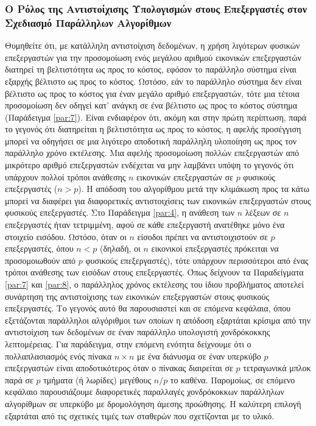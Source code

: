 \documentclass[12pt,a4paper]{article} %
\begin{document}
\subsubsection*{Ο Ρόλος της Αντιστοίχισης Υπολογισμών στους Επεξεργαστές στον \\ Σχεδιασμό Παράλληλων Αλγορίθμων}
Θυμηθείτε ότι, με κατάλληλη αντιστοίχιση δεδομένων, η χρήση λιγότερων 
φυσικών επεξεργαστών για την προσομοίωση ενός μεγάλου αριθμού εικονικών 
επεξεργαστών διατηρεί τη βελτιστότητα ως προς το κόστος, εφόσον το παράλληλο 
σύστημα είναι εξαρχής βέλτιστο ως προς το κόστος. Ωστόσο, εάν το παράλληλο 
σύστημα δεν είναι βέλτιστο ως προς το κόστος για έναν μεγάλο αριθμό 
επεξεργαστών, τότε μια τέτοια προσομοίωση δεν οδηγεί κατ’ ανάγκη σε ένα 
βέλτιστο ως προς το κόστος σύστημα (Παράδειγμα \ref{par:7}). Είναι 
ενδιαφέρον ότι, ακόμη και στην πρώτη περίπτωση, παρά το γεγονός ότι 
διατηρείται η βελτιστότητα ως προς το κόστος, η αφελής προσέγγιση μπορεί 
να οδηγήσει σε μια λιγότερο αποδοτική παράλληλη υλοποίηση ως προς τον 
παράλληλο χρόνο εκτέλεσης. Μια αφελής προσομοίωση πολλών επεξεργαστών από 
μικρότερο αριθμό επεξεργαστών ενδέχεται να μην λαμβάνει υπόψη το γεγονός 
ότι υπάρχουν πολλοί τρόποι ανάθεσης $n$ εικονικών επεξεργαστών σε $p$ 
φυσικούς επεξεργαστές ($n > p$). Η απόδοση του αλγορίθμου μετά την 
κλιμάκωση προς τα κάτω μπορεί να διαφέρει για διαφορετικές αντιστοιχίσεις 
των εικονικών επεξεργαστών στους φυσικούς επεξεργαστές. Στο Παράδειγμα
\ref{par:4}, η ανάθεση των $n$ λέξεων σε $n$ επεξεργαστές ήταν τετριμμένη, 
αφού σε κάθε επεξεργαστή ανατέθηκε μόνο ένα στοιχείο εισόδου. Ωστόσο, 
όταν οι $n$ είσοδοι πρέπει να αντιστοιχιστούν σε $p$ επεξεργαστές, όπου 
$n < p$ (δηλαδή, οι $n$ εικονικοί επεξεργαστές πρόκειται να προσομοιωθούν 
από $p$ φυσικούς επεξεργαστές), τότε υπάρχουν περισσότεροι από ένας τρόποι 
ανάθεσης των εισόδων στους επεξεργαστές. Όπως δείχνουν τα Παραδείγματα 
\ref{par:7} και \ref{par:8}, ο παράλληλος χρόνος εκτέλεσης του ίδιου 
προβλήματος αποτελεί συνάρτηση της αντιστοίχισης των εικονικών επεξεργαστών 
στους φυσικούς επεξεργαστές. Το γεγονός αυτό θα παρουσιαστεί και σε 
επόμενα κεφάλαια, όπου εξετάζονται παράλληλοι αλγόριθμοι των οποίων η 
απόδοση εξαρτάται κρίσιμα από την αντιστοίχιση των δεδομένων σε έναν 
παράλληλο υπολογιστή χονδρόκοκκης λεπτομέρειας. Για παράδειγμα, στην 
επόμενη ενότητα δείχνουμε ότι ο πολλαπλασιασμός ενός πίνακα $n \times n$ 
με ένα διάνυσμα σε έναν υπερκύβο $p$ επεξεργαστών είναι αποδοτικότερος όταν 
ο πίνακας διαιρείται σε $p$ τετραγωνικά μπλοκ παρά σε $p$ τμήματα (ή λωρίδες) 
μεγέθους $n/p$ το καθένα. Παρομοίως, σε επόμενο κεφάλαιο παρουσιάζουμε 
διαφορετικές παραλλαγές χονδρόκοκκων παράλληλων αλγορίθμων σε υπερκύβο 
με δρομολόγηση άμεσης προώθησης. Η καλύτερη επιλογή εξαρτάται από τις 
σχετικές τιμές των σταθερών που σχετίζονται με το υλικό.
\end{document}

